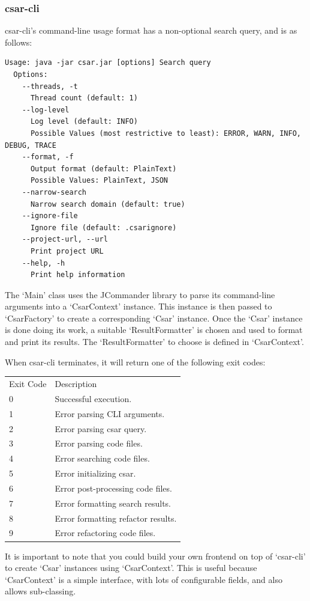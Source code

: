\documentclass[12pt, letterpaper]{article}
\begin{document}
\subsubsection{csar-cli}
csar-cli's command-line usage format has a non-optional search query, and is as follows:
\begin{lstlisting}
Usage: java -jar csar.jar [options] Search query
  Options:
    --threads, -t
      Thread count (default: 1)
    --log-level
      Log level (default: INFO)
      Possible Values (most restrictive to least): ERROR, WARN, INFO, DEBUG, TRACE
    --format, -f
      Output format (default: PlainText)
      Possible Values: PlainText, JSON
    --narrow-search
      Narrow search domain (default: true)
    --ignore-file
      Ignore file (default: .csarignore)
    --project-url, --url
      Print project URL
    --help, -h
      Print help information
\end{lstlisting}

The `Main' class uses the JCommander library to parse its command-line arguments into a `CsarContext' instance.
This instance is then passed to `CsarFactory' to create a corresponding `Csar' instance.
Once the `Csar' instance is done doing its work, a suitable `ResultFormatter' is chosen and used to format and print its results.
The `ResultFormatter' to choose is defined in `CsarContext'.

When csar-cli terminates, it will return one of the following exit codes:
\begin{tabular}{ l l }
  Exit Code & Description \\
  0 & Successful execution. \\
  1 & Error parsing CLI arguments. \\
  2 & Error parsing csar query. \\
  3 & Error parsing code files. \\
  4 & Error searching code files. \\
  5 & Error initializing csar. \\
  6 & Error post-processing code files. \\
  7 & Error formatting search results. \\
  8 & Error formatting refactor results. \\
  9 & Error refactoring code files. \\
\end{tabular}

It is important to note that you could build your own frontend on top of `csar-cli' to create `Csar' instances using `CsarContext'.
This is useful because `CsarContext' is a simple interface, with lots of configurable fields, and also allows sub-classing.
\end{document}
